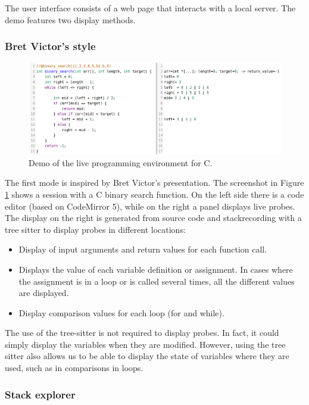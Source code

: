 \documentclass[english,submission]{programming}
\begin{document}
The user interface consists of a web page that interacts with a local server. The demo features two display methods. 

\subsubsection{Bret Victor's style}
\label{sec:bret-victor-style}
\begin{figure}[htbp]
  \centering
  \includegraphics[width=\linewidth]{img/demo/c.png}
  \caption{Demo of the live programming environment for C.}
  \label{fig:demo}
\end{figure}

The first mode is inspired by Bret Victor's presentation. The screenshot in Figure \ref{fig:demo} shows a session with a C binary search function. 
On the left side there is a code editor (based on CodeMirror 5), while on the right a panel displays live probes. The display on the right is generated from source code and stackrecording with a tree sitter to display probes in different locations: 

\begin{itemize}
  \item Display of input arguments and return values for each function call.
  \item Displays the value of each variable definition or assignment. In cases where the assignment is in a loop or is called several times, all the different values are displayed.
  \item Display comparison values for each loop (for and while).
\end{itemize}

The use of the tree-sitter is not required to display probes. In fact, it could simply display the variables when they are modified. However, using the tree sitter also allows us to be able to display the state of variables where they are used, such as in comparisons in loops.

\subsubsection{Stack explorer}
\end{document}
